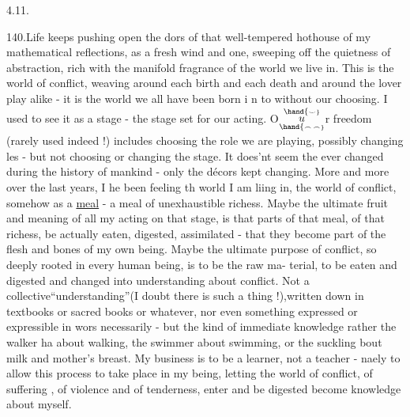 
4.11.

140.\quad Life keeps pushing open the dors of that well-tempered hothouse
of my mathematical reflections, as a fresh wind and  
one, sweeping off the  quietness of  abstraction,  rich with
the manifold fragrance of the world we live in. This is the world of
conflict, weaving around each birth and each death and around the
lover play alike - it is the world we all have been born i n to
without our choosing. I used to see it as a stage - the stage set for
our acting. O$\overset{\hand{\scriptscriptstyle\smile}}{\underset{\hand{\scriptscriptstyle\frown\,\frown}}{u}}$r freedom (rarely used indeed !) includes 
choosing the role we are playing, possibly changing les - but not
choosing or changing the stage. It does'nt seem the  ever changed
during the history of mankind - only the décors kept changing. More
and more  over the last years, I he been feeling th world I am
liing in, the world of conflict, somehow as a \uline{meal} - a meal of
unexhaustible richess. Maybe the ultimate fruit and meaning of all my
acting on that stage, is that parts of that meal, of that richess,
be actually eaten, digested, assimilated - that they become part of
the flesh and bones of my own being. Maybe the ultimate purpose of
conflict, so deeply rooted in every human being, is to be the raw ma-%
terial, to be eaten and digested and changed into understanding about
conflict. Not a collective``understanding''(I doubt there is such a
thing !),written down in text\hand{\textsubscript{$\smile$}}books or sacred books or whatever, nor
even something expressed or expressible in wors necessarily - but
the kind of immediate knowledge rather the walker ha about walking,
the swimmer about swimming, or the suckling bout milk and mother's
breast. My business is to be a learner, not a teacher - naely
to allow this process to take place in my being, letting the world
of conflict, of suffering , of violence and of tenderness, enter
and be digested   become knowledge about myself.

